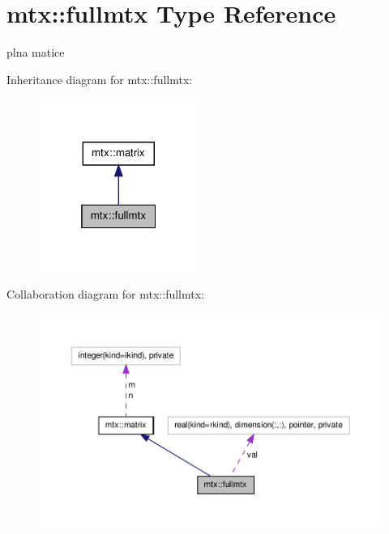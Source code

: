 \hypertarget{structmtx_1_1fullmtx}{\section{mtx\-:\-:fullmtx \-Type \-Reference}
\label{structmtx_1_1fullmtx}
}


plna matice  




\-Inheritance diagram for mtx\-:\-:fullmtx\-:\nopagebreak
\begin{figure}[H]
\begin{center}
\leavevmode
\includegraphics[width=148pt]{structmtx_1_1fullmtx__inherit__graph}
\end{center}
\end{figure}


\-Collaboration diagram for mtx\-:\-:fullmtx\-:
\nopagebreak
\begin{figure}[H]
\begin{center}
\leavevmode
\includegraphics[width=350pt]{structmtx_1_1fullmtx__coll__graph}
\end{center}
\end{figure}
